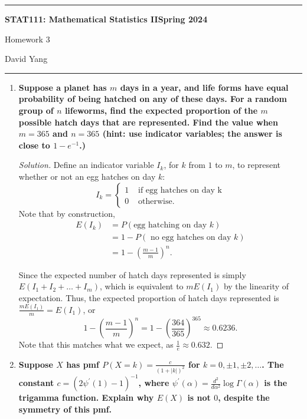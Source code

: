 \documentclass[11pt]{article}
\newenvironment{solution}
  {\renewcommand\qedsymbol{$\blacksquare$}\begin{proof}[Solution]}
  {\end{proof}}
\begin{document}
	\hrule
	\begin{center}
		\textbf{STAT111: Mathematical Statistics II}\hfill \textbf{Spring 2024}\newline

		{\Large Homework 3}

		David Yang
	\end{center}

\hrule

\vspace{1em}

\begin{enumerate}
	\item \textbf{Suppose a planet has $m$ days in a year, and life forms have equal probability of being hatched on any of these days. For a random group of $n$
	lifeworms, find the expected proportion of the $m$ possible hatch days that are represented. Find the value when $m = 365$ and $n = 365$ (hint: use indicator variables; the answer is close to $1 - e^{-1}$.)}

	\begin{solution}
	Define an indicator variable $I_k$, for $k$ from $1$ to $m$, to represent whether or not an egg hatches on day $k$:
	\[
		I_k = \begin{cases}
			1 &\text{ if egg hatches on day k} \\
			0 &\text{ otherwise}.
		\end{cases}
	\]
	Note that by construction, 
	\begin{align*}
		E(I_k) &= P(\text{egg hatching on day $k$}) \\
		&= 1 - P(\text{ no egg hatches on day $k$}) \\
		&= 1- \left( \frac{m-1}{m} \right)^n.
	\end{align*}

	Since the expected number of hatch days represented is simply $E(I_1 + I_2 + \dots + I_m)$, which is equivalent to $mE(I_1)$ by the linearity of expectation. 
  	Thus, the expected proportion of hatch days represented is $\frac{mE(I_1)}{m} = E(I_1)$, or
	\[
		1- \left( \frac{m-1}{m} \right)^n = 1- \left( \frac{364}{365} \right)^{365} \approx \boxed{0.6236}.
	\]
	Note that this matches what we expect, as $\frac{1}{e} \approx 0.632$.
	\end{solution}
	
	\newpage

	\item \textbf{Suppose $X$ has pmf $P(X = k) = \frac{c}{(1+|k|)^2}$ for $k = 0, \pm 1, \pm 2, \dots$. The constant
	$c = (2\psi^{\prime}(1) - 1)^{-1}$, where $\psi^{\prime}(\alpha) = \frac{d^2}{d\alpha^2} \log \Gamma(\alpha)$ is the trigamma function.
	Explain why $E(X)$ is not $0$, despite the symmetry of this pmf.}
	

\end{enumerate}
\end{document}
